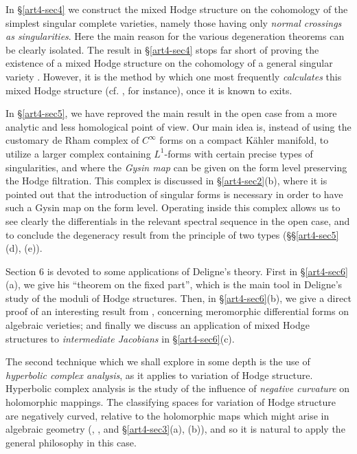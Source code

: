 In \S \ref{art4-sec4} we construct the mixed Hodge structure on the cohomology of the simplest singular complete varieties, namely those having only \textit{normal crossings as singularities}. Here the main reason for the various degeneration theorems can be clearly isolated. The result in \S \ref{art4-sec4} stops far short of proving the existence of a mixed Hodge structure on the cohomology of a general singular variety \cite{art4-key14}. However, it is the method by which one most frequently \textit{calculates} this mixed Hodge structure (cf. \cite{art4-key10}, for instance), once it is known to exits.

In \S \ref{art4-sec5}, we have reproved the main result in the open case \cite{art4-key13} from a more analytic and less homological point of view. Our main idea is, instead of using the customary de Rham complex of $C^\infty$ forms on a compact K\"ahler manifold, to utilize a larger complex containing $L^1$-forms with certain precise types of singularities, and where the \textit{Gysin map} can be given on the form level preserving the Hodge filtration. This complex is discussed in \S\ref{art4-sec2}(b), where it is pointed out that the introduction of singular forms is necessary in order to have such a Gysin map on the form level. Operating inside this complex allows us to see clearly the differentials in the relevant spectral sequence in the open case, and to conclude the degeneracy result from the principle of two types (\S\S\ref{art4-sec5}(d), (e)).

Section 6 is devoted to some applications of Deligne's theory. First in \S \ref{art4-sec6}(a), we give his ``theorem on the fixed part'', which is the main tool in Deligne's study of the moduli of Hodge structures. Then, in \S\ref{art4-sec6}(b), we give a direct proof of an interesting result from \cite{art4-key13}, concerning meromorphic differential forms on algebraic verieties; and finally we discuss an application of mixed Hodge structures to \textit{intermediate Jacobians} in \S \ref{art4-sec6}(c).

The second technique which we shall explore in some depth is the use of \textit{hyperbolic complex analysis}, as it applies to variation of Hodge structure. Hyperbolic complex analysis is the study of the influence of \textit{negative curvature} on holomorphic mappings. The classifying spaces for variation of Hodge structure are negatively curved, relative to the holomorphic maps which might arise in algebraic geometry (\cf \cite{art4-key11}, \cite{art4-key25}, and \S \ref{art4-sec3}(a), (b)), and so it is natural to apply the general philosophy in this case.

